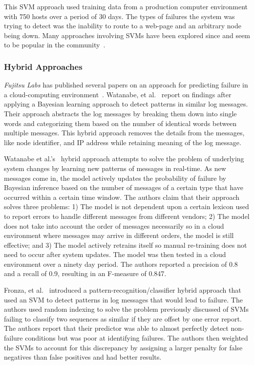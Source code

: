 This \ac{SVM} approach used training data from a production computer
environment with 750 hosts over a period of 30 days.  The types of failures the
system was trying to detect was the inability to route to a web-page and an
arbitrary node being down.  Many approaches involving \ac{SVM}s have been
explored since and seem to be popular in the community~\cite{fronza2013,
fulp2008, murray2005, domeniconi2002, irrera2015}.

\subsubsection{Hybrid Approaches}
\emph{Fujitsu Labs} has published several papers on an approach for predicting
failure in a cloud-computing
environment~\cite{sonoda2012,watanabe2012,watanabe2014}.  Watanabe, et
al.~\cite{watanabe2014, watanabe2012} report on findings after applying a
Bayesian learning approach to detect patterns in similar log messages.  Their
approach abstracts the log messages by breaking them down into single words and
categorizing them based on the number of identical words between multiple
messages.  This hybrid approach removes the details from the messages, like
node identifier, and \ac{IP} address while retaining meaning of the log
message.

Watanabe et al.'s~\cite{watanabe2014} hybrid approach attempts to solve the
problem of underlying system changes by learning new patterns of messages in
real-time.  As new messages come in, the model actively updates the probability
of failure by Bayesian inference based on the number of messages of a certain
type that have occurred within a certain time window.  The authors claim that
their approach solves three problems: 1)  The model is not dependent upon a
certain lexicon used to report errors to handle different messages from
different vendors; 2) The model does not take into account the order of
messages necessarily so in a cloud environment where messages may arrive in
different orders, the model is still effective; and 3)  The model actively
retrains itself so manual re-training does not need to occur after system
updates.  The model was then tested in a cloud environment over a ninety day
period.  The authors reported a precision of 0.8 and a recall of 0.9, resulting
in an F-measure of 0.847.  

Fronza, et al.~\cite{fronza2013} introduced a pattern-recognition/classifier
hybrid approach that used an \ac{SVM} to detect patterns in log messages that
would lead to failure.  The authors used random indexing to solve the problem
previously discussed of \ac{SVM}s failing to classify two sequences as similar
if they are offset by one error report.  The authors report that their
predictor was able to almost perfectly detect non-failure conditions but was
poor at identifying failures.  The authors then weighted the \ac{SVM}s to
account for this discrepancy by assigning a larger penalty for false negatives
than false positives and had better results.

